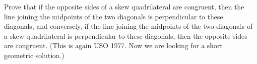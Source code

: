 Prove that if the opposite sides of a skew quadrilateral are congruent, then the line joining the midpoints of the two diagonals is perpendicular to these diagonals, and conversely, if the line joining the midpoints of the two diagonals of a skew quadrilateral is perpendicular to these diagonals, then the opposite sides are congruent. (This is again USO 1977. Now we are looking for a short geometric solution.)
